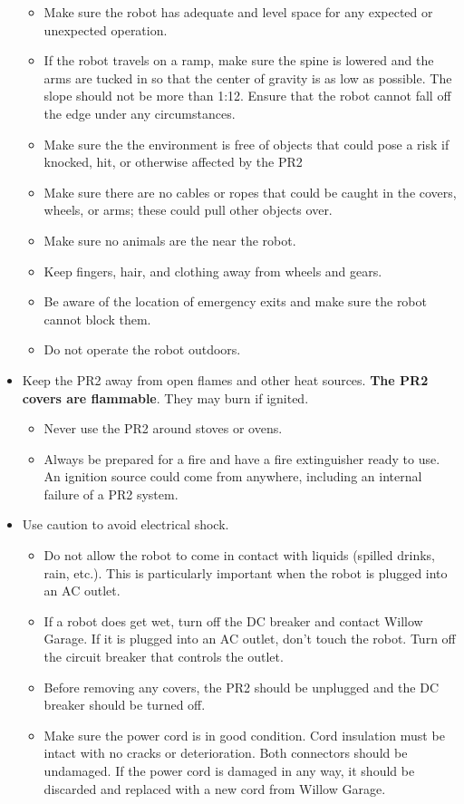 \begin{itemize}
\begin{itemize}
\item Make sure the robot has adequate and level space for any expected or unexpected operation.
\item If the robot travels on a ramp, make sure the spine is lowered and the arms are tucked in so that the center of gravity is as low as possible. The slope should not be more than 1:12. Ensure that the robot cannot fall off the edge under any circumstances.
\item Make sure the the environment is free of objects that could pose a risk if knocked, hit, or otherwise affected by the PR2
\item Make sure there are no cables or ropes that could be caught in the covers, wheels, or arms; these could pull other objects over.
\item Make sure no animals are the near the robot.
\item Keep fingers, hair, and clothing away from wheels and gears.
\item Be aware of the location of emergency exits and make sure the robot cannot block them.
\item Do not operate the robot outdoors.
\end{itemize}
\item Keep the PR2 away from open flames and other heat sources. {\bf The PR2 covers are flammable}. They may burn if ignited.
\begin{itemize}
\item Never use the PR2 around stoves or ovens.
\item Always be prepared for a fire and have a fire extinguisher ready to use. An ignition source could come from anywhere, including an internal failure of a PR2 system. 
\end{itemize}
\item Use caution to avoid electrical shock.
\begin{itemize}
\item Do not allow the robot to come in contact with liquids (spilled drinks, rain, etc.). This is particularly important when the robot is plugged into an AC outlet.
\item If a robot does get wet, turn off the DC breaker and contact Willow Garage. If it is plugged into an AC outlet, don't touch the robot. Turn off the circuit breaker that controls the outlet.
\item Before removing any covers, the PR2 should be unplugged and the DC breaker should be turned off.
\item Make sure the power cord is in good condition. Cord insulation must be intact with no cracks or deterioration. Both connectors should be undamaged. If the power cord is damaged in any way, it should be discarded and replaced with a new cord from Willow Garage.

\end{itemize}
\end{itemize}
